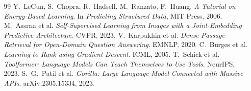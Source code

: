 \documentclass[11pt]{article}
\begin{document}
\begin{thebibliography}{99}
 Y.~LeCun, S.~Chopra, R.~Hadsell, M.~Ranzato, F.~Huang.
\emph{A Tutorial on Energy-Based Learning}. In \emph{Predicting Structured Data},
MIT Press, 2006.
 M.~Assran et al. \emph{Self-Supervised Learning from Images with a
Joint-Embedding Predictive Architecture}. CVPR, 2023.
 V.~Karpukhin et al. \emph{Dense Passage Retrieval for Open-Domain
Question Answering}. EMNLP, 2020.
 C.~Burges et al. \emph{Learning to Rank using Gradient Descent}.
ICML, 2005.
 T.~Schick et al. \emph{Toolformer: Language Models Can Teach
Themselves to Use Tools}. NeurIPS, 2023.
 S.~G.~Patil et al. \emph{Gorilla: Large Language Model Connected
with Massive APIs}. arXiv:2305.15334, 2023.
\end{thebibliography}
\end{document}
